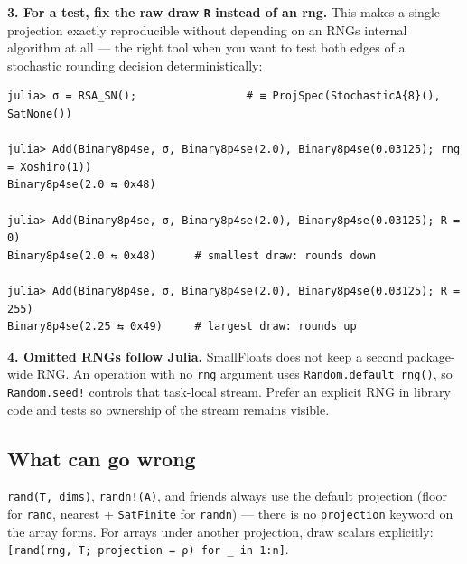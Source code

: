 \textbf{3. For a test, fix the raw draw \texttt{R} instead of an rng.} This makes a single projection exactly reproducible without depending on an RNG{\textquotesingle}s internal algorithm at all — the right tool when you want to test both edges of a stochastic rounding decision deterministically:




\nopagebreak[4]
\begin{verbatim}
julia> σ = RSA_SN();                 # ≡ ProjSpec(StochasticA{8}(), SatNone())

julia> Add(Binary8p4se, σ, Binary8p4se(2.0), Binary8p4se(0.03125); rng = Xoshiro(1))
Binary8p4se(2.0 ⇆ 0x48)

julia> Add(Binary8p4se, σ, Binary8p4se(2.0), Binary8p4se(0.03125); R = 0)
Binary8p4se(2.0 ⇆ 0x48)      # smallest draw: rounds down

julia> Add(Binary8p4se, σ, Binary8p4se(2.0), Binary8p4se(0.03125); R = 255)
Binary8p4se(2.25 ⇆ 0x49)     # largest draw: rounds up
\end{verbatim}



\textbf{4. Omitted RNGs follow Julia.} SmallFloats does not keep a second package-wide RNG. An operation with no \texttt{rng} argument uses \texttt{Random.default\_\allowbreak{}rng()}, so \texttt{Random.seed!} controls that task-local stream. Prefer an explicit RNG in library code and tests so ownership of the stream remains visible.



\subsection{What can go wrong}



\label{7385351218440078181-dup3}{}


\begin{tcolorbox}[toptitle=-1mm,bottomtitle=1mm,colback=admonition-warning!50!white,colframe=admonition-warning,title=\textbf{Array and `!` forms always use the defaults}]
\texttt{rand(T, dims)}, \texttt{randn!(A)}, and friends always use the default projection (floor for \texttt{rand}, nearest + \texttt{SatFinite} for \texttt{randn}) — there is no \texttt{projection} keyword on the array forms. For arrays under another projection, draw scalars explicitly: \texttt{[rand(\allowbreak{}rng, T; projection = ρ) for \_\allowbreak{} in 1:n]}.

\end{tcolorbox}


